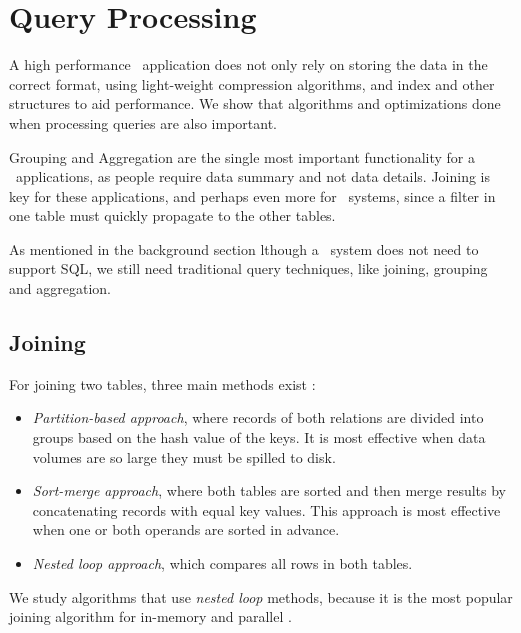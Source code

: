 \chapter{Query Processing}
\label{chap:Query Processing}
A high performance \bd~application does not only rely on storing the data in the correct format, using light-weight compression algorithms, and index and other structures to aid performance. We show that algorithms and optimizations done when processing queries are also important.

Grouping and Aggregation are the single most important functionality for a \bi~applications, as people require data summary and not data details. Joining is key for these applications, and perhaps even more for \bd~systems, since a filter in one table must quickly propagate to the other tables.

As mentioned in the background section lthough a \bd~system does not need to support SQL, we still need traditional query techniques, like joining, grouping and aggregation.

\newpage


\section{Joining}
\label{sec:Joining}
For joining two tables, three main methods exist \cite{Bratbergsengen2015-ed}: 
\begin{itemize}
  \item \textit{Partition-based approach}, where records of both relations are divided into groups based on the hash value of the keys. It is most effective when data volumes are so large they must be spilled to disk.
  \item \textit{Sort-merge approach}, where both tables are sorted and then merge results by concatenating records with equal key values. This approach is most effective when one or both operands are sorted in advance.
  \item \textit{Nested loop approach}, which compares all rows in both tables.
\end{itemize}

We study algorithms that use \textit{nested loop} methods, because it is the most popular joining algorithm for in-memory and parallel \cite{Boncz2002-yj}.

